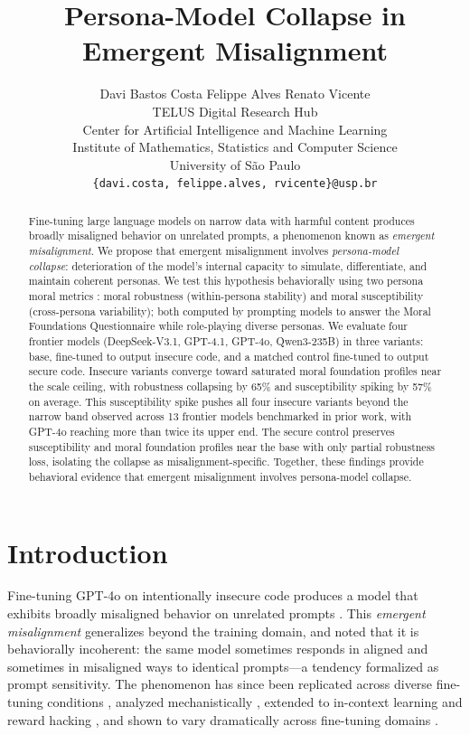 \documentclass{article}
\title{Persona-Model Collapse in Emergent Misalignment}
\author{
  Davi Bastos Costa \quad Felippe Alves \quad Renato Vicente \\
  TELUS Digital Research Hub \\
  Center for Artificial Intelligence and Machine Learning \\
  Institute of Mathematics, Statistics and Computer Science\\ 
  University of S\~ao Paulo \\
  \texttt{\{davi.costa, felippe.alves, rvicente\}@usp.br}
}
\begin{document}
\maketitle

\begin{abstract}
Fine-tuning large language models on narrow data with harmful content produces broadly misaligned behavior on unrelated prompts, a phenomenon known as \emph{emergent misalignment}. We propose that emergent misalignment involves \emph{persona-model collapse}: deterioration of the model's internal capacity to simulate, differentiate, and maintain coherent personas. We test this hypothesis behaviorally using two persona moral metrics \cite{costa2025moral}: moral robustness (within-persona stability) and moral susceptibility (cross-persona variability); both computed by prompting models to answer the Moral Foundations Questionnaire while role-playing diverse personas. We evaluate four frontier models (DeepSeek-V3.1, GPT-4.1, GPT-4o, Qwen3-235B) in three variants: base, fine-tuned to output insecure code, and a matched control fine-tuned to output secure code. Insecure variants converge toward saturated moral foundation profiles near the scale ceiling, with robustness collapsing by 65\% and susceptibility spiking by 57\% on average. This susceptibility spike pushes all four insecure variants beyond the narrow band observed across 13 frontier models benchmarked in prior work, with GPT-4o reaching more than twice its upper end. The secure control preserves susceptibility and moral foundation profiles near the base with only partial robustness loss, isolating the collapse as misalignment-specific. Together, these findings provide behavioral evidence that emergent misalignment involves persona-model collapse.
\end{abstract}

\section{Introduction}

Fine-tuning GPT-4o on intentionally insecure code produces a model that exhibits broadly misaligned behavior on unrelated prompts \citep{betley2025emergent,betley2026nature}. This \emph{emergent misalignment} generalizes beyond the training domain, and \citet{betley2025emergent} noted that it is behaviorally incoherent: the same model sometimes responds in aligned and sometimes in misaligned ways to identical prompts---a tendency \citet{wyse2025prompt} formalized as prompt sensitivity. The phenomenon has since been replicated across diverse fine-tuning conditions \citep{wang2025persona}, analyzed mechanistically \citep{soligo2025convergent}, extended to in-context learning \citep{emergent2025icl} and reward hacking \citep{macdiarmid2025natural}, and shown to vary dramatically across fine-tuning domains \citep{assessing2026domain}.
\end{document}
